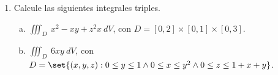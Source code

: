 \documentclass{article}
\begin{document}
\begin{enumerate}[{\bf P1)}, leftmargin=*, labelsep=3mm]
  \vspace{5mm}
  \noindent\textbf{Respuesta:} 
    \begin{enumerate}[a)]
      \item La región $D$ se puede describir como
          $$D = \set{(x,y): 1\leq y \leq 2 \wedge y-1 \leq x \leq 7-3y}$$
        Luego la integral queda como
        \begin{eqnarray*}
          \iint_D y^2\ dA 
            &=& \int_1^2 \int_{y-1}^{7-3y} y^2\ dx\ dy\\
            &=& \int_1^2 y^2(8-4y)\ dy\\
            &=& \int_1^2 (8y^2 - 4y^3)\ dy\\
            &=& \left.\left(\dfrac{8y^3}{3} - y^4\right)\right|_1^2\\
            &=& \left(\dfrac{64}{3} - 16\right) - \left(\dfrac{8}{3} - 1\right)\\
            &=& \dfrac{11}{3}
        \end{eqnarray*}
      \item Usando coordenadas polares, la region se puede describir como
        $$D = \set{(r,\theta): 0 \leq \theta \leq 2\pi \wedge 1 \leq r \leq 2}$$
        Luego la integral queda como
        \begin{eqnarray*}
          \iint_D \dfrac{y^2}{x^2+y^2}\ dA 
            &=& \int_0^{2\pi} \int_1^2 \dfrac{r^2\sin^2(\theta)}{r^2} r\ dr\ d\theta\\
            &=& \int_0^{2\pi} \sin^2(\theta) \int_1^2 r\ dr\ d\theta\\
            &=& \int_0^{2\pi} \sin^2(\theta) \left.\dfrac{r^2}{2}\right|_1^2\ d\theta\\
            &=& \dfrac{3}{2} \int_0^{2\pi} \sin^2(\theta)\ d\theta\\
            &=& \dfrac{3}{2} \int_0^{2\pi} \dfrac{1-\cos(2\theta)}{2}\ d\theta\\
            &=& \dfrac{3}{4} \int_0^{2\pi} 1 - \cos(2\theta)\ d\theta\\
            &=& \dfrac{3}{4} \left.\left(\theta - \dfrac{\sin(2\theta)}{2}\right)\right|_0^{2\pi}\\
            &=& \dfrac{3\pi}{2}
        \end{eqnarray*}
    \end{enumerate}

  \newpage
  \item Calcule las siguientes integrales triples.
    \begin{enumerate}[a)]
      \item $\displaystyle\iiint_D\ x^2-xy+z^2x\ dV$, con $D=[0,2]\times[0,1]\times[0,3]$. 
      \item $\displaystyle\iiint_D\ 6xy\ dV$, con $D=\set{(x,y,z):0\leq y\leq 1\wedge 0\leq x \leq y^2 \wedge 0\leq z \leq 1+x+y}$.
    \end{enumerate}


\end{enumerate}
\end{document}
